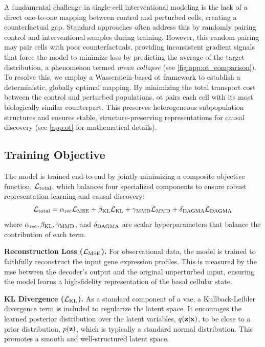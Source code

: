 A fundamental challenge in single-cell interventional modeling is the lack of a direct one-to-one mapping between control and perturbed cells, creating a counterfactual gap.
Standard approaches often address this by randomly pairing control and interventional samples during training.
However, this random pairing may pair cells with poor counterfactuals, providing inconsistent gradient signals that force the model to minimize loss by predicting the average of the target distribution, a phenomenon termed \textit{mean collapse} (see \cref{fig:app:ot_comparison}).
To resolve this, we employ a Wasserstein-based \gls{ot} framework to establish a deterministic, globally optimal mapping.
By minimizing the total transport cost between the control and perturbed populations, \gls{ot} pairs each cell with its most biologically similar counterpart.
This preserves heterogeneous subpopulation structures and ensures stable, structure-preserving representations for causal discovery (see \cref{app:ot} for mathematical details).

\subsection{Training Objective}
\label{subsec:methods:loss}

The model is trained end-to-end by jointly minimizing a composite objective function, $\mathcal{L}_{\text{total}}$, which balances four specialized components to ensure robust representation learning and causal discovery:
\begin{equation}
    \mathcal{L}_{\text{total}} = \alpha_{\text{rec}}\mathcal{L}_{\text{MSE}} + \beta_{\text{KL}}\mathcal{L}_{\text{KL}} + \gamma_{\text{MMD}}\mathcal{L}_{\text{MMD}} + \delta_{\text{DAGMA}}\mathcal{L}_{\text{DAGMA}}
    \label{eq:total_loss}
\end{equation}
where $\alpha_{\text{rec}}, \beta_{\text{KL}}, \gamma_{\text{MMD}}$, and $\delta_{\text{DAGMA}}$ are scalar hyperparameters that balance the contribution of each term.

\textbf{Reconstruction Loss ($\mathcal{L}_{\text{MSE}}$).}
For observational data, the model is trained to faithfully reconstruct the input gene expression profiles.
This is measured by the \gls{mse} between the decoder's output and the original unperturbed input, ensuring the model learns a high-fidelity representation of the basal cellular state.

\textbf{KL Divergence ($\mathcal{L}_{\text{KL}}$).}
As a standard component of a \gls{vae}, a Kullback-Leibler divergence term is included to regularize the latent space.
It encourages the learned posterior distribution over the latent variables, $q({\mathbf{z}}|{\mathbf{x}})$, to be close to a prior distribution, $p({\mathbf{z}})$, which is typically a standard normal distribution.
This promotes a smooth and well-structured latent space.

